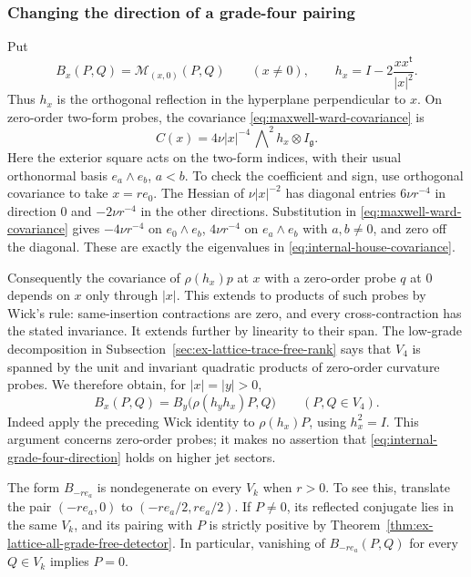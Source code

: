 \subsubsection{Changing the direction of a grade-four pairing}
Put
\[
 B_x(P,Q)=\mathcal M_{(x,0)}(P,Q)\qquad(x\ne0),
 \qquad h_x=I-2\frac{xx^{\mathsf t}}{|x|^2}.
\]
Thus $h_x$ is the orthogonal reflection in the hyperplane perpendicular
to $x$. On zero-order two-form probes, the covariance
\eqref{eq:maxwell-ward-covariance} is
\begin{equation}\label{eq:internal-house-covariance}
 C(x)=4\nu |x|^{-4}\,\bigwedge\nolimits^2 h_x
                  \otimes I_{\mathfrak g}.
\end{equation}
Here the exterior square acts on the two-form indices, with their usual
orthonormal basis $e_a\wedge e_b$, $a<b$. To check the coefficient and
sign, use orthogonal covariance to take $x=re_0$. The Hessian of
$\nu|x|^{-2}$ has diagonal entries $6\nu r^{-4}$ in direction $0$
and $-2\nu r^{-4}$ in the other directions. Substitution in
\eqref{eq:maxwell-ward-covariance} gives $-4\nu r^{-4}$ on
$e_0\wedge e_b$, $4\nu r^{-4}$ on $e_a\wedge e_b$ with $a,b\ne0$,
and zero off the diagonal. These are exactly the eigenvalues in
\eqref{eq:internal-house-covariance}.

Consequently the covariance of $\rho(h_x)p$ at $x$ with a zero-order
probe $q$ at $0$ depends on $x$ only through $|x|$. This extends to
products of such probes by Wick's rule: same-insertion contractions are
zero, and every cross-contraction has the stated invariance. It extends
further by linearity to their span. The low-grade decomposition in
Subsection~\ref{sec:ex-lattice-trace-free-rank} says that $V_4$ is spanned
by the unit and invariant quadratic products of zero-order curvature
probes. We therefore obtain, for $|x|=|y|>0$,
\begin{equation}\label{eq:internal-grade-four-direction}
 B_x(P,Q)=B_y\bigl(\rho(h_yh_x)P,Q\bigr)
                   \qquad(P,Q\in V_4).
\end{equation}
Indeed apply the preceding Wick identity to $\rho(h_x)P$, using
$h_x^2=I$. This argument concerns zero-order probes; it makes no
assertion that \eqref{eq:internal-grade-four-direction} holds on higher
jet sectors.

The form $B_{-re_a}$ is nondegenerate on every $V_k$ when $r>0$.
To see this, translate the pair $(-re_a,0)$ to
$(-re_a/2,re_a/2)$. If $P\ne0$, its reflected conjugate lies in the
same $V_k$, and its pairing with $P$ is strictly positive by
Theorem~\ref{thm:ex-lattice-all-grade-free-detector}. In particular,
vanishing of $B_{-re_a}(P,Q)$ for every $Q\in V_k$ implies $P=0$.


